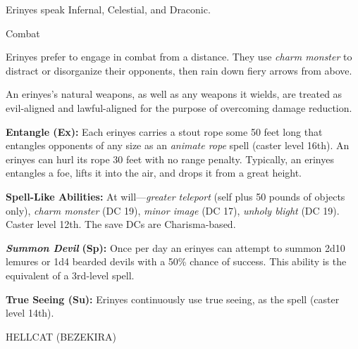 \documentclass{article}
\begin{document}
Erinyes speak Infernal, Celestial, and Draconic.

Combat

Erinyes prefer to engage in combat from a distance. They use \textit{charm monster 
}to distract or disorganize their opponents, then rain down fiery arrows from above.

An erinyes's natural weapons, as well as any weapons it wields, are treated as 
evil-aligned and lawful-aligned for the purpose of overcoming damage reduction.

\textbf{Entangle (Ex):} Each erinyes carries a stout rope some 50 feet long that 
entangles opponents of any size as an \textit{animate rope }spell (caster level 
16th). An erinyes can hurl its rope 30 feet with no range penalty. Typically, an 
erinyes entangles a foe, lifts it into the air, and drops it from a great height.

\textbf{Spell-Like Abilities: }At will---\textit{greater teleport }(self plus 50 
pounds of objects only), \textit{charm monster }(DC 19), \textit{minor image }(DC 
17), \textit{unholy blight }(DC 19). Caster level 12th. The save DCs are Charisma-based.

\textit{\textbf{Summon Devil }}\textbf{(Sp): }Once per day an erinyes can attempt 
to summon 2d10 lemures or 1d4 bearded devils with a 50\% chance of success. This 
ability is the equivalent of a 3rd-level spell.

\textbf{True Seeing (Su):} Erinyes continuously use true seeing, as the spell (caster 
level 14th).

\vspace{12pt}
HELLCAT (BEZEKIRA)
\end{document}
